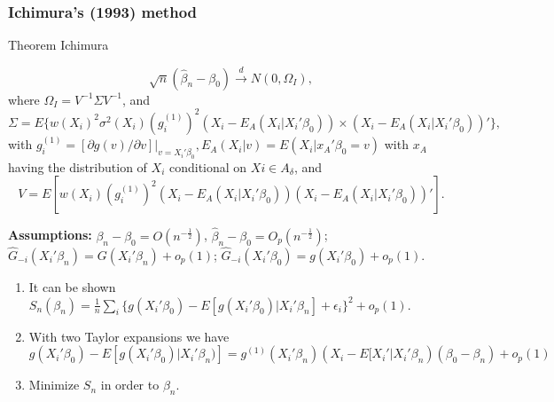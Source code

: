 \documentclass{beamer}
\begin{document}

\begin{frame}
\frametitle{Ichimura's (1993) method}
\begin{block}{Theorem Ichimura}
{\footnotesize \[ \sqrt{n}(\hat{\beta}_n - \beta_0) \stackrel{d}{\rightarrow} N(0,\Omega_I), \] where $\Omega_I = V^{-1}\Sigma V^{-1}$, and \[\Sigma = E\{w(X_i)^2\sigma^2(X_i)(g_i^{(1)})^2(X_i - E_A(X_i|X_i'\beta_0)) \times (X_i - E_A(X_i|X_i'\beta_0))'\},\] with $g_i^{(1)} = [\partial g(v)/\partial v]|_{v = X_i'\beta_0}, E_A(X_i|v) = E(X_i|x_A'\beta_0 = v)$ with $x_A$ having the distribution of $X_i$ conditional on $Xi \in A_\delta$, and \[ V = E[w(X_i)(g_i^{(1)})^2(X_i - E_A(X_i|X_i'\beta_0))(X_i - E_A(X_i|X_i'\beta_0))'].\] \par}
\end{block}

{\footnotesize \textbf{Assumptions:} $\beta_n - \beta_0 = O(n^{-\frac{1}{2}})$, $\hat{\beta}_n - \beta_0 = O_p(n^{-\frac{1}{2}})$; $ \hat{G}_{-i}(X_i'\beta_n) = G(X_i'\beta_n) + o_p(1)$; $\hat{G}_{-i}(X_i'\beta_0) = g(X_i'\beta_0) + o_p(1)$. \par}
\begin{enumerate}
	\item It can be shown $ S_{n}(\beta_n) = \frac{1}{n}\sum_i \{ g(X_i'\beta_0) - E[g(X_i'\beta_0)|X_i'\beta_n] +  \epsilon_i\}^2 + o_p(1)$.	
	\item With two Taylor expansions we have
$g(X_i'\beta_0) - E[g(X_i'\beta_0)|X_i'\beta_n)] 
 = g^{(1)}(X_i'\beta_n)( X_i - E[X_i'|X_i'\beta_n)(\beta_0 - \beta_n) + o_p(1)$
	\item Minimize $S_n$ in order to $\beta_n$.

\end{enumerate}

\note{~}

\end{frame}
\end{document}
